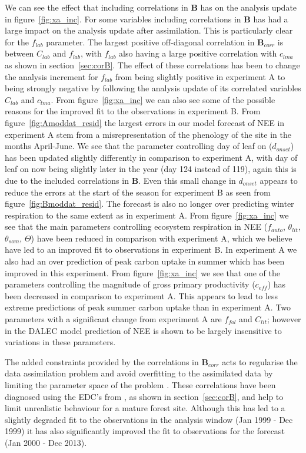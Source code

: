 \documentclass[review]{elsarticle}
\begin{document}
We can see the effect that including correlations in $\textbf{B}$ has on the analysis update in figure~\ref{fig:xa_inc}. For some variables including correlations in $\textbf{B}$ has had a large impact on the analysis update after assimilation. This is particularly clear for the $f_{lab}$ parameter. The largest positive off-diagonal correlation in $\textbf{B}_{corr}$ is between $C_{lab}$ and $f_{lab}$, with $f_{lab}$ also having a large positive correlation with $c_{lma}$ as shown in section~\ref{sec:corB}. The effect of these correlations has been to change the analysis increment for $f_{lab}$ from being slightly positive in experiment A to being strongly negative by following the analysis update of its correlated variables $C_{lab}$ and $c_{lma}$. From figure~\ref{fig:xa_inc} we can also see some of the possible reasons for the improved fit to the observations in experiment B. From figure~\ref{fig:Amoddat_resid} the largest errors in our model forecast of NEE in experiment A stem from a misrepresentation of the phenology of the site in the months April-June. We see that the parameter controlling day of leaf on ($d_{onset}$) has been updated slightly differently in comparison to experiment A, with day of leaf on now being slightly later in the year (day 124 instead of 119), again this is due to the included correlations in $\textbf{B}$. Even this small change in $d_{onset}$ appears to reduce the errors at the start of the season for experiment B as seen from figure~\ref{fig:Bmoddat_resid}. The forecast is also no longer over predicting winter respiration to the same extent as in experiment A. From figure~\ref{fig:xa_inc} we see that the main parameters controlling ecosystem respiration in NEE ($f_{auto}$, $\theta_{lit}$, $\theta_{som}$, $\Theta$) have been reduced in comparison with experiment A, which we believe have led to an improved fit to observations in experiment B. In experiment A we also had an over prediction of peak carbon uptake in summer which has been improved in this experiment. From figure~\ref{fig:xa_inc} we see that one of the parameters controlling the magnitude of gross primary productivity ($c_{eff}$) has been decreased in comparison to experiment A. This appears to lead to less extreme predictions of peak summer carbon uptake than in experiment A. Two parameters with a significant change from experiment A are $f_{fol}$ and $C_{lit}$; however in \citet{Ann2013} the DALEC model prediction of NEE is shown to be largely insensitive to variations in these parameters.

The added constraints provided by the correlations in $\textbf{B}_{corr}$ acts to regularise the data assimilation problem and avoid overfitting to the assimilated data by limiting the parameter space of the problem \citep{smith2009variational}. These correlations have been diagnosed using the EDC's from \citet{Bloom2015}, as shown in section~\ref{sec:corB}, and help to limit unrealistic behaviour for a mature forest site. Although this has led to a slightly degraded fit to the observations in the analysis window (Jan 1999 - Dec 1999) it has also significantly improved the fit to observations for the forecast (Jan 2000 - Dec 2013).
\end{document}
